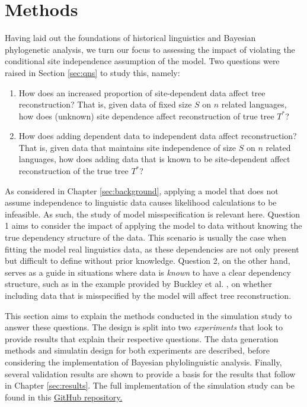\chapter{Methods}
\label{sec:methods}
Having laid out the foundations of historical linguistics and Bayesian phylogenetic analysis, we turn our focus to assessing the impact of violating the conditional site independence assumption of the model. Two questions were raised in Section \ref{sec:qns} to study this, namely:
\begin{enumerate}
    \item How does an increased proportion of site-dependent data affect tree reconstruction? That is, given data of fixed size $S$ on $n$ related languages, how does (unknown) site dependence affect reconstruction of true tree $T^*$?
    \item How does adding dependent data to independent data affect reconstruction? That is, given data that maintains site independence of size $S$ on $n$ related languages, how does adding data that is known to be site-dependent affect reconstruction of the true tree $T^*$?
\end{enumerate}

As considered in Chapter \ref{sec:background}, applying a model that does not assume independence to linguistic data causes likelihood calculations to be infeasible. As such, the study of model misspecification is relevant here. Question 1 aims to consider the impact of applying the model to data without knowing the true dependency structure of the data. This scenario is usually the case when fitting the model real linguistics data, as these dependencies are not only present but difficult to define without prior knowledge. Question 2, on the other hand, serves as a guide in situations where data is \textit{known} to have a clear dependency structure, such as in the example provided by Buckley et al. \cite{Buckley2025}, on whether including data that is misspecified by the model will affect tree reconstruction.

This section aims to explain the methods conducted in the simulation study to answer these questions. The design is split into two \textit{experiments} that look to provide results that explain their respective questions. The data generation methods and simulatin design for both experiments are described, before considering the implementation of Bayesian phylolinguistic analysis. Finally, several validation results are shown to provide a basis for the results that follow in Chapter \ref{sec:results}. The full implementation of the simulation study can be found in this \hyperlink{https://github.com/jaamestaay/M4R}{GitHub repository.}

